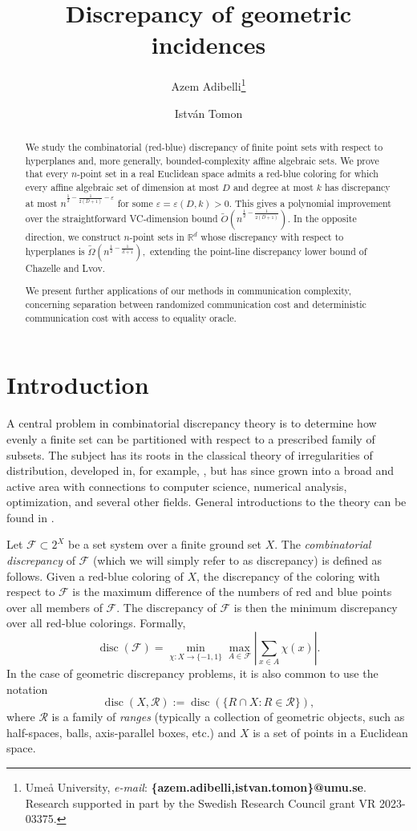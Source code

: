 \documentclass[11pt]{article}
\title{Discrepancy of geometric incidences}
\author{Azem Adibelli\thanks{Ume\r{a} University, \emph{e-mail}: \textbf{\{azem.adibelli,istvan.tomon\}@umu.se}. Research supported in part by the Swedish Research Council grant VR 2023-03375.}
	\and 
	Istv\'an Tomon\footnotemark[1]}
\date{}
\theoremstyle{plain}
\theoremstyle{definition}
\newcommand{\eps}{\varepsilon}
\DeclareMathOperator{\disc}{disc}
\begin{document}
	\sloppy 
	\maketitle
	
	\begin{abstract}
		We study the combinatorial (red-blue) discrepancy of finite point sets with respect to hyperplanes and, more generally, bounded-complexity affine algebraic sets. We prove that every $n$-point set in a real Euclidean space admits a red-blue coloring for which every affine algebraic set of dimension at most $D$ and degree at most $k$ has discrepancy at most
$n^{\frac12-\frac{1}{2(D+1)}-\eps}$
for some $\eps=\eps(D,k)>0$. This gives a polynomial improvement over the straightforward VC-dimension bound $\tilde O(n^{\frac12-\frac{1}{2(D+1)}})$. In the opposite direction, we construct $n$-point sets in $\mathbb R^d$ whose discrepancy with respect to hyperplanes is
$\tilde\Omega(n^{\frac12-\frac{1}{d+1}}),$
extending the point-line discrepancy lower bound of Chazelle and Lvov. %
		
		We present further applications of our methods in communication complexity, concerning separation between randomized communication cost and deterministic communication cost with access to equality oracle.
	\end{abstract}


    
	\section{Introduction}
	
	A central problem in combinatorial discrepancy theory is to determine how evenly a finite set can be partitioned with respect to a prescribed family of subsets. The subject has its roots in the classical theory of irregularities of distribution, developed in, for example, \cite{BC,DT}, but has since grown into a broad and active area with connections to computer science, numerical analysis, optimization, and several other fields. General introductions to the theory can be found in \cite{BN,Ch,MatBook}.
	
	Let $\mathcal{F}\subset 2^X$ be a set system over a finite ground set $X$. The \emph{combinatorial discrepancy} of $\mathcal{F}$ (which we will simply refer to as discrepancy) is defined as follows. Given a red-blue coloring of $X$, the discrepancy of the coloring with respect to $\mathcal{F}$ is the maximum difference of the numbers of red and blue points over all members of $\mathcal{F}$. The discrepancy of $\mathcal{F}$ is then the minimum discrepancy over all red-blue colorings. Formally,
	$$\disc(\mathcal{F})=\min_{\chi:X\rightarrow \{-1,1\}}\max_{A\in \mathcal{F}} \left| \sum_{x\in A}\chi(x)\right|.$$
	In the case of geometric discrepancy problems, it is also common to use the notation
	$$\disc(X,\mathcal{R}):=\disc(\{R\cap X: R\in \mathcal{R}\}),$$
	where $\mathcal{R}$ is a family of \emph{ranges} (typically a collection of geometric objects, such as half-spaces, balls, axis-parallel boxes, etc.) and $X$ is a set of points in a Euclidean space.
	
\end{document}
